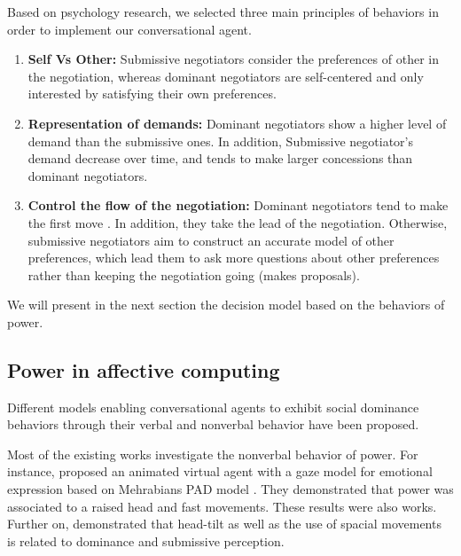 \documentclass{llncs}
\begin{document}
	
	Based on psychology research, we selected three main principles of behaviors in order to implement our conversational agent.
	\begin{enumerate}
	\item \textbf{Self Vs Other:} Submissive negotiators consider the preferences of other in the negotiation, whereas dominant negotiators  are self-centered and only interested by satisfying their own preferences.
	
	\item \textbf{Representation of demands:} Dominant negotiators show a higher level of demand than the submissive ones. In addition,  Submissive negotiator's demand decrease over time, and tends to make larger concessions than dominant negotiators.
	
	\item \textbf{Control the flow of the negotiation:}
	Dominant negotiators tend to make the first move \cite{magee2007power}. In addition, they take the lead of the negotiation. Otherwise, submissive negotiators aim to construct an accurate model of other preferences, which lead them to ask more questions about other preferences rather than keeping the negotiation going (makes proposals).
	
	\end{enumerate}
		We will present in the next section the decision model based on the behaviors of power. 
	
	\subsection{Power in affective computing }
	Different models enabling conversational agents to exhibit social dominance behaviors through their verbal and nonverbal behavior have been proposed. 
	
	Most of the existing works investigate the nonverbal behavior of power. For instance, \cite{lance2008relation} proposed an animated virtual agent with a gaze model for emotional expression based on Mehrabians PAD model \cite{mehrabian1996analysis}. They demonstrated that power was associated to a raised head and fast movements. These results were also \cite{mignault2003many} works.
	 Further on, \cite{gebhard2014exploring,callejas2014computational} demonstrated that head-tilt as well as the use of spacial movements is related to dominance and submissive perception. 
	  
\end{document}

